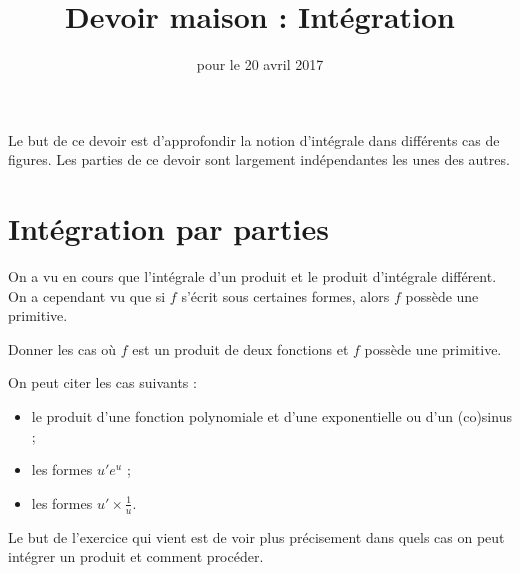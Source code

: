 \documentclass[11pt,a4paper,french]{article}
\title{Devoir maison \no 4 : Intégration}
\author{\bsc{Jumel}}
\date{pour le 20 avril 2017}
\makeatletter
\renewcommand{\maketitle}%
{\framebox{%
    \begin{minipage}{1.0\linewidth}%
      \begin{center}%
        \Large \@title ~-- \@author \\%
        \@date%
      \end{center}%
    \end{minipage}}%
  \normalsize%
}
\theoremstyle{break}
\theoremstyle{plain}
\theoremstyle{nonumberplain}
\theoremstyle{nonumberbreak}
\makeatother
\begin{document}
\noindent\maketitle

\bigskip

Le but de ce devoir est d'approfondir la notion d'intégrale dans
différents cas de figures. Les parties de ce devoir sont largement
indépendantes les unes des autres.

\section{Intégration par parties}

On a vu en cours que l'intégrale d'un produit et le produit d'intégrale
différent. On a cependant vu que si $f$ s'écrit sous certaines formes,
alors $f$ possède une primitive.

\begin{question}
  Donner les cas où $f$ est un produit de deux fonctions et $f$ possède
  une primitive.
\end{question}
\begin{solution}
  On peut citer les cas suivants :
  \begin{itemize}
    \item le produit d'une fonction polynomiale et d'une exponentielle
      ou d'un (co)sinus ;
    \item les formes $u'e^u$ ;
    \item les formes $u' \times \frac1u$.
  \end{itemize}
\end{solution}

Le but de l'exercice qui vient est de voir plus précisement dans quels
cas on peut intégrer un produit et comment procéder.
\end{document}
